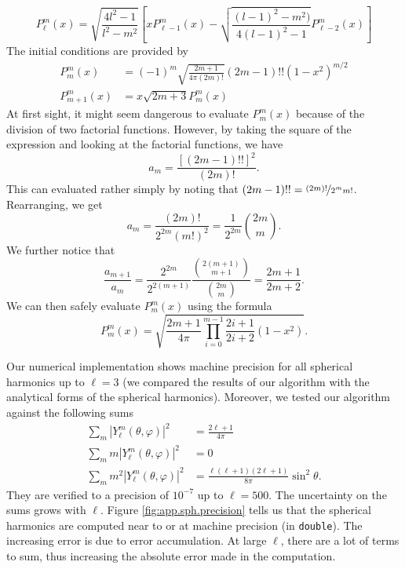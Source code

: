   \begin{equation}
   P_\ell^m(x)=\sqrt{\frac{4l^2-1}{l^2-m^2}}\left[xP_{\ell-1}^m(x)-\sqrt{\frac{(l-1)^2-m^2)}{4(l-1)^2-1}}P_{\ell-2}^m(x)\right]
  \end{equation}
The initial conditions are provided by 
  \begin{align}
   P_m^m(x)	&=(-1)^m\sqrt{\frac{2m+1}{4\pi(2m)!}}(2m-1)!!(1-x^2)^{m/2}	\\
   P_{m+1}^m(x)	&=x\sqrt{2m+3}P_m^m(x)
  \end{align}
At first sight, it might seem dangerous to evaluate 
$P_m^m(x)$ because of the division of two factorial functions. 
However, by taking the square of the expression and looking
at the factorial functions, we have
  \begin{equation}
   a_m = \frac{[(2m-1)!!]^2}{(2m)!}.
  \end{equation}
This can evaluated rather simply by noting that $(2m-1)!!=\nicefrac{(2m)!}{2^mm!}$.
Rearranging, we get
  \begin{equation*}
   a_m = \frac{(2m)!}{2^{2m}(m!)^2} = \frac{1}{2^{2m}}\binom{2m}{m}.
  \end{equation*}
We further notice that
  \begin{equation}
   \frac{a_{m+1}}{a_m} = \frac{2^{2m}}{2^{2(m+1)}}\frac{\binom{2(m+1)}{m+1}}{\binom{2m}{m}}=\frac{2m+1}{2m+2}.
  \end{equation}
We can then safely evaluate $P_m^m(x)$ using the formula
  \begin{equation}
   P_m^m(x) = \sqrt{\frac{2m+1}{4\pi}\prod_{i=0}^{m-1}\frac{2i+1}{2i+2}(1-x^2)}.
  \end{equation}

Our numerical implementation shows machine precision for all spherical
harmonics up to $\ell=3$ (we compared the results of our algorithm 
with the analytical forms of the spherical harmonics).  Moreover, we 
tested our algorithm against the following sums \cite[\S 5.10]{VAR1988}
  \begin{align}
   \sum_{m} \left|Y_\ell^m(\theta,\varphi)\right|^2	&= \frac{2\ell+1}{4\pi}	\label{eq:app.sph.sum1}\\
   \sum_m m\left|Y_\ell^m(\theta,\varphi)\right|^2 	&= 0			\label{eq:app.sph.sum2}\\
   \sum_m m^2\left|Y_\ell^m(\theta,\varphi)\right|^2	&= \frac{\ell(\ell+1)(2\ell+1)}{8\pi}\sin^2\theta.\label{eq:app.sph.sum3}
  \end{align}
They are verified to a precision of $10^{-7}$ up to $\ell=500$. The uncertainty
on the sums grows with $\ell$. Figure \ref{fig:app.sph.precision} tells us 
that the spherical harmonics are computed near to or at machine precision
(in \texttt{double}). The increasing error is due to error accumulation. 
At large $\ell$, there are a lot of terms to sum, thus increasing
the absolute error made in the computation. 

